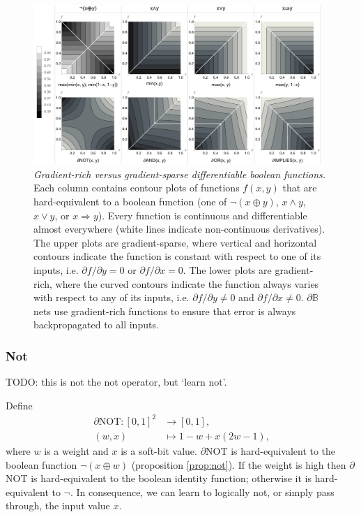 \documentclass{article} %
\begin{document}
\begin{figure}[t]
	\centering
	\includegraphics[trim=0pt 0pt 0pt 0pt, clip, width=0.975\textwidth]{logic-gates.png}
	\caption{{\em Gradient-rich versus gradient-sparse differentiable boolean functions.} Each column contains contour plots of functions $f(x,y)$ that are hard-equivalent to a boolean function (one of $\neg(x \oplus y)$, $x \wedge y$, $x \vee y$, or $x \Rightarrow y$). Every function is continuous and differentiable almost everywhere (white lines indicate non-continuous derivatives). The upper plots are gradient-sparse, where vertical and horizontal contours indicate the function is constant with respect to one of its inputs, i.e. $\partial f/\partial y = 0$ or $\partial f/\partial x = 0$. The lower plots are gradient-rich, where the curved contours indicate the function always varies with respect to any of its inputs, i.e. $\partial f/\partial y \neq 0$ and $\partial f/\partial x \neq 0$. $\partial \mathbb{B}$ nets use gradient-rich functions to ensure that error is always backpropagated to all inputs.} 
	\label{fig:and-plot}
\end{figure}

\subsubsection{Not}

TODO: this is not the not operator, but `learn not'.

Define
	\begin{equation*}
	\begin{aligned}
	\partial\text{NOT}: [0, 1]^{2} &\to [0,1], \\
	(w, x) &\mapsto 1 - w + x (2w - 1)\text{,}
	\end{aligned}
	\end{equation*}
where $w$ is a weight and $x$ is a soft-bit value.
$\partial${NOT} is hard-equivalent to the boolean function $\neg(x \oplus w)$ (proposition \ref{prop:not}). If the weight is high then $\partial${NOT} is hard-equivalent to the boolean identity function; otherwise it is hard-equivalent to $\neg$. In consequence, we can learn to logically not, or simply pass through, the input value $x$.
\end{document}
